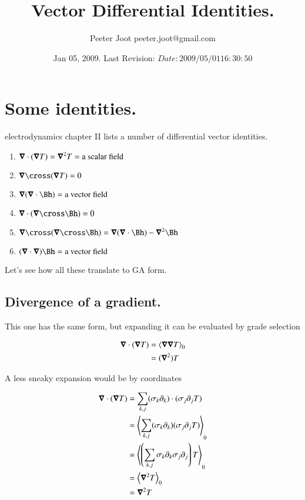 \documentclass{article}
\title{ Vector Differential Identities. }
\author{Peeter Joot \quad peeter.joot@gmail.com}
\date{ Jan 05, 2009.  Last Revision: $Date: 2009/05/01 16:30:50 $ }
\begin{document}
\maketitle{}
\section{ Some identities. }

\cite{feynman1963flp} electrodynamics chapter II lists a number of
differential vector identities.

\begin{enumerate}
\item $\boldsymbol{\nabla} \cdot (\boldsymbol{\nabla} T) = \boldsymbol{\nabla}^2 T = \mbox{a scalar field}$
\item $\spacegrad \cross (\spacegrad T) = 0$
\item $\spacegrad (\spacegrad \cdot \Bh) = \mbox{a vector field}$
\item $\spacegrad \cdot (\spacegrad \cross \Bh) = 0$
\item $\spacegrad \cross (\spacegrad \cross \Bh) = \spacegrad(\spacegrad \cdot \Bh) - \spacegrad^2 \Bh$
\item $(\spacegrad \cdot \spacegrad) \Bh = \mbox{a vector field}$
\end{enumerate}

Let's see how all these translate to GA form.

\subsection{ Divergence of a gradient. }

This one has the same form, but expanding it can be evaluated by grade
selection

\begin{align*}
\boldsymbol{\nabla} \cdot (\boldsymbol{\nabla} T) 
&= {\left\langle{{\boldsymbol{\nabla}\boldsymbol{\nabla}T}}\right\rangle}_{0} \\
&= (\boldsymbol{\nabla}^2) T
\end{align*}

A less sneaky expansion would be by coordinates

\begin{align*}
\boldsymbol{\nabla} \cdot (\boldsymbol{\nabla} T) 
&= {\sum_{k,j} (\sigma_k \partial_k) \cdot (\sigma_j \partial_j T)} \\
&= {\left\langle{{\sum_{k,j} (\sigma_k \partial_k) (\sigma_j \partial_j T)}}\right\rangle}_{0} \\
&= {\left\langle{{\left(\sum_{k,j} \sigma_k \partial_k \sigma_j \partial_j\right) T}}\right\rangle}_{0} \\
&= {\left\langle{{\boldsymbol{\nabla}^2 T}}\right\rangle}_{0} \\
&= \boldsymbol{\nabla}^2 T \\
\end{align*}
\end{document}
